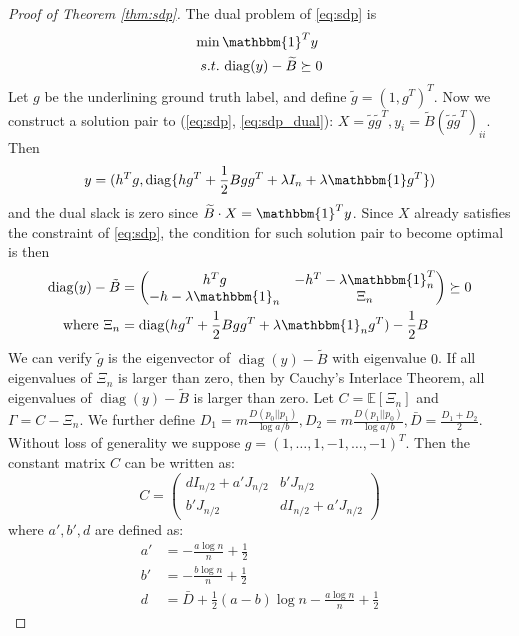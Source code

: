 \documentclass[conference]{IEEEtran}
\DeclareMathOperator{\diag}{diag}
\begin{document}
\begin{proof}[Proof of Theorem \ref{thm:sdp}]
The dual problem of \eqref{eq:sdp} is
\begin{align}
\min\, & \mathbbm{1}^T y \notag \\
s.t.\,& \diag(y) - \widetilde{B} \succeq 0
\label{eq:sdp_dual}
\end{align}
Let $g$ be the underlining ground truth label, and
define $\tilde{g} = (1,g^T)^T$.
Now we construct a solution pair to (\ref{eq:sdp}, \ref{eq:sdp_dual}): $X=\tilde{g}\tilde{g}^T, y_i = \tilde{B}(\tilde{g}\tilde{g}^T)_{ii}$.
Then $$
y = (h^T g, \diag\{hg^T+\frac{1}{2}Bgg^T + \lambda I_n + \lambda \mathbbm{1}g^T\})
$$
and the dual slack is zero since $\widetilde{B} \cdot X = \mathbbm{1}^T y $.
Since $X$ already satisfies the constraint of \eqref{eq:sdp}, the condition for such solution pair to become optimal is then
\begin{align}
\diag(y) - \tilde{B} & = \begin{pmatrix} h^T g & -h^T - \lambda \mathbbm{1}_n^T \\ -h- \lambda \mathbbm{1}_n & \Xi_n \end{pmatrix}
\succeq 0 \notag \\
\textrm{ where }\Xi_n & = \diag(hg^T + \frac{1}{2}Bgg^T + \lambda \mathbbm{1}_ng^T) - \frac{1}{2}B
\end{align}
We can verify $\tilde{g}$ is the eigenvector of $\diag(y) - \tilde{B}$ with eigenvalue $0$.
If all eigenvalues of $\Xi_n$ is larger than zero, then by
Cauchy’s Interlace Theorem, all eigenvalues of $\diag(y) - \tilde{B}$ is larger than zero.
Let $C=\mathbb{E}[\Xi_n]$ and $\Gamma = C-\Xi_n$.
We further define $D_1 = m\frac{D(p_0||p_1)}{\log a/b},
D_2 = m\frac{D(p_1||p_0)}{\log a/b}, \bar{D}=\frac{D_1+D_2}{2}$.
Without loss of generality we suppose $g=(1, \dots, 1, -1, \dots, -1)^T$.
Then the constant matrix $C$ can be written as:
	\begin{equation*}
	C=\begin{pmatrix}
	d I_{n/2} + a'J_{n/2}& b' J_{n/2} \\
	b' J_{n/2} & d I_{n/2} + a'J_{n/2}  
	\end{pmatrix}
	\end{equation*}
where $a',b', d$ are defined as:
\begin{align*}
a' & = - \frac{a \log n}{n} + \frac{1}{2} \\
b' & = - \frac{b \log n}{n} + \frac{1}{2} \\
d & = \bar{D}+\frac{1}{2}(a-b) \log n - \frac{a \log n}{n} + \frac{1}{2}
\end{align*}


\end{proof}
\end{document}
